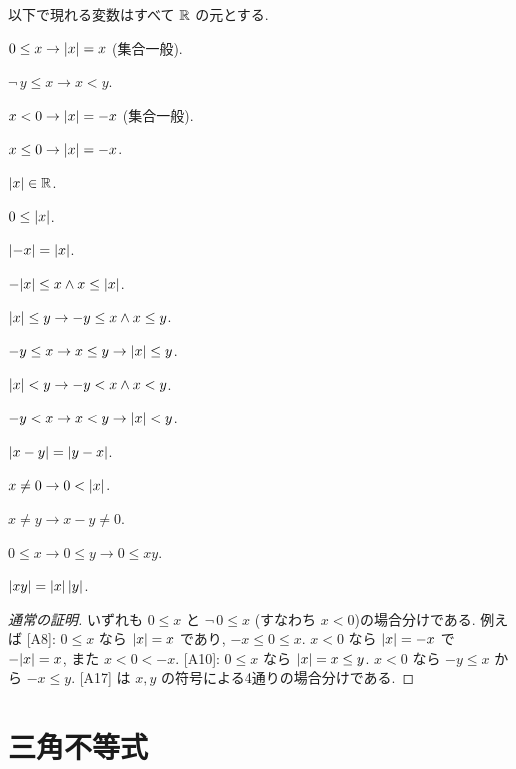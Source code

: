 \begin{lem}\label{lem:abs-basic}
  以下で現れる変数はすべて $\mathbb{R}$ の元とする.
  \begin{enumerate}[label={[A\arabic*]}]
    \item $0 \leq x \to \lvert x\rvert = x$ (集合一般).
    \item $\neg\, y \leq x \to x < y$.
    \item $x < 0 \to \lvert x\rvert = -x$ (集合一般).
    \item $x \leq 0 \to \lvert x\rvert = -x$.
    \item $\lvert x\rvert \in \mathbb{R}$.
    \item $0 \leq \lvert x\rvert$.
    \item $\lvert -x\rvert = \lvert x\rvert$.
    \item $-\lvert x\rvert \leq x \land x \leq \lvert x\rvert$.
    \item $\lvert x\rvert \leq y \to -y \leq x \land x \leq y$.
    \item $-y \leq x \to x \leq y \to \lvert x\rvert \leq y$.
    \item $\lvert x\rvert < y \to -y < x \land x < y$.
    \item $-y < x \to x < y \to \lvert x\rvert < y$.
    \item $\lvert x - y\rvert = \lvert y - x\rvert$.
    \item[{[A14]}] $x \neq 0 \to 0 < \lvert x\rvert$.
    \item[{[A15]}] $x \neq y \to x - y \neq 0$.
    \item[{[A16]}] $0 \leq x \to 0 \leq y \to 0 \leq x y$.
    \item[{[A17]}] $\lvert x y\rvert = \lvert x\rvert\,\lvert y\rvert$.
  \end{enumerate}
\end{lem}
\begin{proof}[通常の証明]
  いずれも $0 \leq x$ と $\neg\, 0 \leq x$ (すなわち $x < 0$)の場合分けである. 例えば [A8]: $0 \leq x$ なら $\lvert x\rvert = x$ であり, $-x \leq 0 \leq x$. $x < 0$ なら $\lvert x\rvert = -x$ で $-\lvert x\rvert = x$, また $x < 0 < -x$. [A10]: $0 \leq x$ なら $\lvert x\rvert = x \leq y$. $x < 0$ なら $-y \leq x$ から $-x \leq y$. [A17] は $x, y$ の符号による4通りの場合分けである.
\end{proof}

\section{三角不等式}

